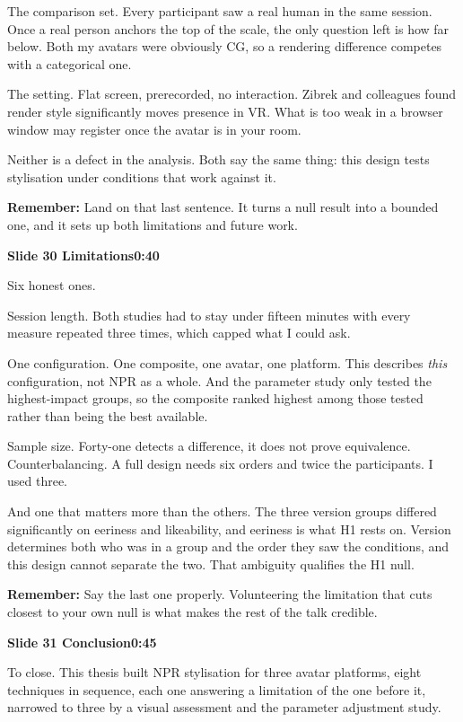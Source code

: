 \documentclass[11pt,a4paper]{article}
\newcommand{\slidehead}[3]{%
  \needspace{5\baselineskip}
  \vspace{0.9em}
  \noindent\colorbox{knblue}{\parbox{0.978\textwidth}{\vspace{1pt}\color{white}\textbf{Slide #1 \quad #2}\hfill\textbf{#3}\vspace{1pt}}}
  \vspace{0.35em}\par}
\newcommand{\remind}[1]{%
  \vspace{0.15em}
  \noindent\colorbox{knlight}{\parbox{0.972\textwidth}{\small\color{knblue}\textbf{Remember:} #1}}
  \vspace{0.2em}\par}
\begin{document}
The comparison set. Every participant saw a real human in the same session. Once a real person anchors the top of the scale, the only question left is how far below. Both my avatars were obviously CG, so a rendering difference competes with a categorical one.

The setting. Flat screen, prerecorded, no interaction. Zibrek and colleagues found render style significantly moves presence in VR. What is too weak in a browser window may register once the avatar is in your room.

Neither is a defect in the analysis. Both say the same thing: this design tests stylisation under conditions that work against it.

\remind{Land on that last sentence. It turns a null result into a bounded one, and it sets up both limitations and future work.}

\slidehead{30}{Limitations}{0:40}

Six honest ones.

Session length. Both studies had to stay under fifteen minutes with every measure repeated three times, which capped what I could ask.

One configuration. One composite, one avatar, one platform. This describes \emph{this} configuration, not NPR as a whole. And the parameter study only tested the highest-impact groups, so the composite ranked highest among those tested rather than being the best available.

Sample size. Forty-one detects a difference, it does not prove equivalence. Counterbalancing. A full design needs six orders and twice the participants. I used three.

And one that matters more than the others. The three version groups differed significantly on eeriness and likeability, and eeriness is what H1 rests on. Version determines both who was in a group and the order they saw the conditions, and this design cannot separate the two. That ambiguity qualifies the H1 null.

\remind{Say the last one properly. Volunteering the limitation that cuts closest to your own null is what makes the rest of the talk credible.}

\slidehead{31}{Conclusion}{0:45}

To close. This thesis built NPR stylisation for three avatar platforms, eight techniques in sequence, each one answering a limitation of the one before it, narrowed to three by a visual assessment and the parameter adjustment study.
\end{document}
